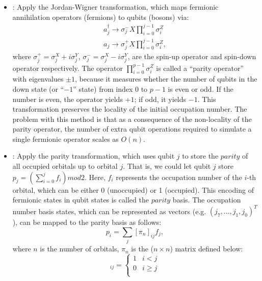 \begin{itemize}
    \item \methodjordanwigner: Apply the Jordan-Wigner transformation, which maps fermionic annihilation operators (fermions) to qubits (bosons) via:
          \begin{equation}
              \begin{split}
                  a_j^{\dagger} \to {\sigma}_j^{-} X \prod_{i=0}^{j-1} {\sigma}^Z_i \\
                  a_j \to {\sigma}_j^{+} X \prod_{i=0}^{j-1} {\sigma}^Z_i,
              \end{split}
          \end{equation}
          where ${\sigma}_j^{+} = {\sigma}_j^X+i{\sigma}_j^Y$, ${\sigma}_j^{-} = {\sigma}_j^X-i{\sigma}_j^Y$, are the spin-up operator and spin-down operator respectively. The operator $\prod_{i=0}^{p-1} {{\sigma}^Z_i}$ is called a ``parity operator'' with eigenvalues $\pm 1$, because it measures whether the number of qubits in the down state (or ``$-1$'' state) from index 0 to $p-1$ is even or odd. If the number is even, the operator yields $+1$; if odd, it yields $-1$. This transformation preserves the locality of the initial occupation number. The problem with this method is that as a consequence of the non-locality of the parity operator, the number of extra qubit operations required to simulate a single fermionic operator scales as $O(n)$.
    \item \methodparity: Apply the parity transformation, which uses qubit $j$ to store the $parity$ of all occupied orbitals up to orbital $j$. That is, we could let qubit $j$ store $p_j = (\sum_{i=0}^j f_i) mod 2$. Here, $f_i$ represents the occupation number of the $i$-th orbital, which can be either 0 (unoccupied) or 1 (occupied). This encoding of fermionic states in qubit states is called the $parity$ basis. The occupation number basis states, which can be represented as vectors (e.g. $(j_7,...,j_1,j_0)^T$), can be mapped to the parity basis as follows:
          \begin{equation}
              p_i = \sum_j {[\pi_n]_{ij} f_j},
          \end{equation}
          where $n$ is the number of orbitals, $\pi_n$ is the ($n \times n$) matrix defined below:
          \begin{equation}
              [\pi_n]_{ij} =
              \begin{cases}
                  1 & i<j     \\
                  0 & i\geq j \\

\end{cases}
\end{equation}
\end{itemize}
